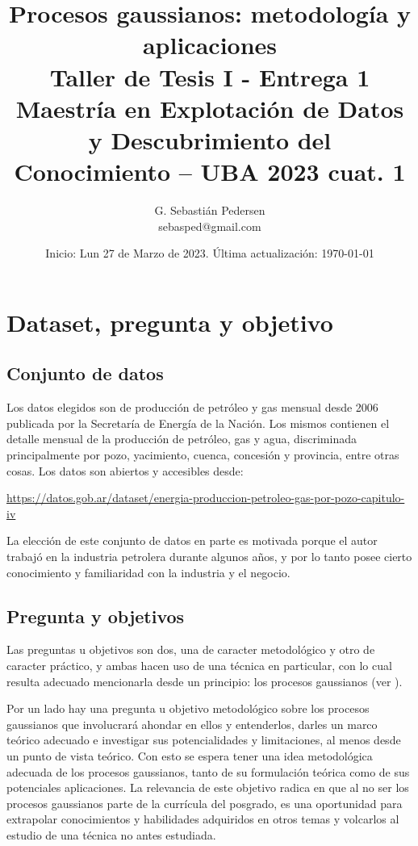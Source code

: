 \documentclass[a4paper]{article}
\title{Procesos gaussianos: metodología y aplicaciones\\ Taller de Tesis I - Entrega 1\\ Maestría en Explotación de Datos y Descubrimiento del Conocimiento -- UBA 2023 cuat. 1}%
\author{G. Sebastián Pedersen \\ {\small sebasped@gmail.com}}
\date{Inicio: Lun 27 de Marzo de 2023. Última actualización: \today}
\begin{document}

	
\maketitle

\tableofcontents	



\section{Dataset, pregunta y objetivo}
\subsection{Conjunto de datos}
\label{subsec:dataset}
Los datos elegidos son de producción de petróleo y gas mensual desde 2006 publicada por la Secretaría de Energía de la Nación. Los mismos contienen el detalle mensual de la producción de petróleo, gas y agua, discriminada principalmente por pozo, yacimiento, cuenca, concesión y provincia, entre otras cosas. Los datos son abiertos y accesibles desde: 

\url{https://datos.gob.ar/dataset/energia-produccion-petroleo-gas-por-pozo-capitulo-iv}

La elección de este conjunto de datos en parte es motivada porque el autor trabajó en la industria petrolera durante algunos años, y por lo tanto posee cierto conocimiento y familiaridad con la industria y el negocio.


\subsection{Pregunta y objetivos}
\label{subsec:pregunta}
Las preguntas u objetivos son dos, una de caracter metodológico y otro de caracter práctico, y ambas hacen uso de una técnica en particular, con lo cual resulta adecuado mencionarla desde un principio: los procesos gaussianos (ver \cite{gramacy, tobar, rasmussen, murphy}). 

Por un lado hay una pregunta u objetivo metodológico sobre los procesos gaussianos que involucrará ahondar en ellos y entenderlos, darles un marco teórico adecuado e investigar sus potencialidades y limitaciones, al menos desde un punto de vista teórico. Con esto se espera tener una idea metodológica adecuada de los procesos gaussianos, tanto de su formulación teórica como de sus potenciales aplicaciones. La relevancia de este objetivo radica en que al no ser los procesos gaussianos parte de la currícula del posgrado, es una oportunidad para extrapolar conocimientos y habilidades adquiridos en otros temas y volcarlos al estudio de una técnica no antes estudiada.
\end{document}
